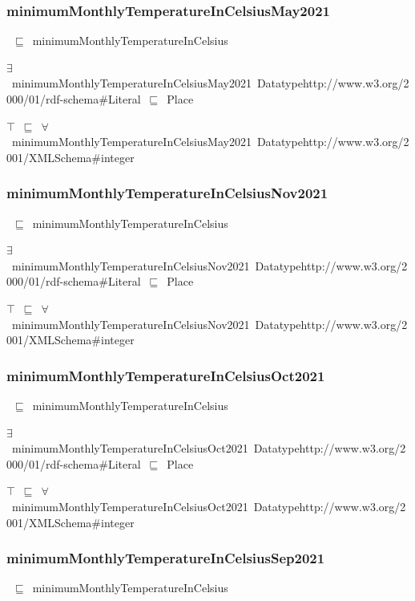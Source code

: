 \documentclass{article}
\begin{document}
\subsubsection*{minimumMonthlyTemperatureInCelsiusMay2021}

~\ensuremath{\sqsubseteq}~minimumMonthlyTemperatureInCelsius

\ensuremath{\exists}~minimumMonthlyTemperatureInCelsiusMay2021~Datatypehttp://www.w3.org/2000/01/rdf-schema#Literal~\ensuremath{\sqsubseteq}~Place

\ensuremath{\top}~\ensuremath{\sqsubseteq}~\ensuremath{\forall}~minimumMonthlyTemperatureInCelsiusMay2021~Datatypehttp://www.w3.org/2001/XMLSchema#integer

\subsubsection*{minimumMonthlyTemperatureInCelsiusNov2021}

~\ensuremath{\sqsubseteq}~minimumMonthlyTemperatureInCelsius

\ensuremath{\exists}~minimumMonthlyTemperatureInCelsiusNov2021~Datatypehttp://www.w3.org/2000/01/rdf-schema#Literal~\ensuremath{\sqsubseteq}~Place

\ensuremath{\top}~\ensuremath{\sqsubseteq}~\ensuremath{\forall}~minimumMonthlyTemperatureInCelsiusNov2021~Datatypehttp://www.w3.org/2001/XMLSchema#integer

\subsubsection*{minimumMonthlyTemperatureInCelsiusOct2021}

~\ensuremath{\sqsubseteq}~minimumMonthlyTemperatureInCelsius

\ensuremath{\exists}~minimumMonthlyTemperatureInCelsiusOct2021~Datatypehttp://www.w3.org/2000/01/rdf-schema#Literal~\ensuremath{\sqsubseteq}~Place

\ensuremath{\top}~\ensuremath{\sqsubseteq}~\ensuremath{\forall}~minimumMonthlyTemperatureInCelsiusOct2021~Datatypehttp://www.w3.org/2001/XMLSchema#integer

\subsubsection*{minimumMonthlyTemperatureInCelsiusSep2021}

~\ensuremath{\sqsubseteq}~minimumMonthlyTemperatureInCelsius
\end{document}

